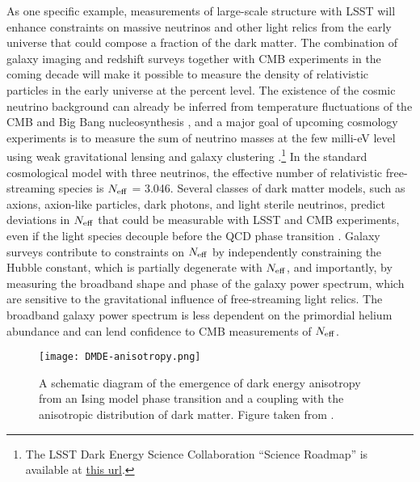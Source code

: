 As one specific example, measurements of large-scale structure with LSST will enhance constraints on massive neutrinos and other light relics from the early universe that could compose a fraction of the dark matter. The combination of galaxy imaging and redshift surveys together with CMB experiments in the coming decade will make it possible to measure the density of relativistic particles in the early universe at the percent level. The existence of the cosmic neutrino background can already be inferred from temperature fluctuations of the CMB \citep{Planck:2018_cosmo_params} and Big Bang nucleosynthesis \citep{Cooke:2018}, and a major goal of upcoming cosmology experiments is to measure the sum of neutrino masses at the few milli-eV level using weak gravitational lensing and galaxy clustering \citep[e.g.,][]{CMB-S4:2016,DESI:2016,Mishra-Sharma:2018}.\footnote{The LSST Dark Energy Science Collaboration ``Science Roadmap'' is available at \href{http://lsstdesc.org/sites/default/files/DESC_SRM_V1_4.pdf}{this url}.} In the standard cosmological model with three neutrinos, the effective number of relativistic free-streaming species is $N_{\rm eff}$ = 3.046. Several classes of dark matter models, such as axions, axion-like particles, dark photons, and light sterile neutrinos, predict deviations in $N_{\rm eff}$ that could be measurable with LSST and CMB experiments, even if the light species decouple before the QCD phase transition \citep{Font-Ribera:2014,Baumann:2018}. Galaxy surveys contribute to constraints on $N_{\rm eff}$ by independently constraining the Hubble constant, which is partially degenerate with $N_{\rm eff}$, and importantly, by measuring the broadband shape and phase of the galaxy power spectrum, which are sensitive to the gravitational influence of free-streaming light relics. The broadband galaxy power spectrum is less dependent on the primordial helium abundance and can lend confidence to CMB measurements of $N_{\rm eff}$.

\begin{figure}[t]
\centering
\texttt{[image: DMDE-anisotropy.png]}
\caption{A schematic diagram of the emergence of dark energy anisotropy from an Ising model phase transition and a coupling with the anisotropic distribution of dark matter. Figure taken from \citet{1810.11007}.}
\label{fig:DMDEmap}
\end{figure}

